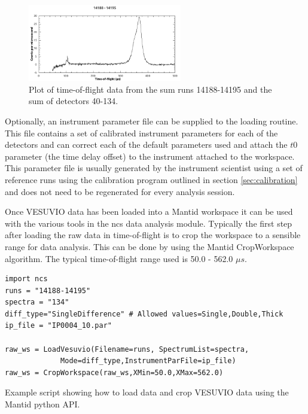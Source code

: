 \documentclass[paper=a4, fontsize=11pt]{scrartcl}	%
\numberwithin{equation}{section}															%
\numberwithin{figure}{section}																%
\numberwithin{table}{section}
\begin{document}
\begin{figure}[H]
\centering
\includegraphics[width=0.6\textwidth]{img/tof-spectrum.png}
\caption{Plot of time-of-flight data from the sum runs 14188-14195 and the sum of detectors 40-134.}
\label{fig:tof-spectrum}
\end{figure}

Optionally, an instrument parameter file can be supplied to the loading routine. This file contains a set of calibrated instrument parameters for each of the detectors and can correct each of the default parameters used and attach the $t0$ parameter (the time delay offset)\cite{mayers2011calibration} to the instrument attached to the workspace. This parameter file is usually generated by the instrument scientist using a set of reference runs using the calibration program outlined in section \ref{sec:calibration} and does not need to be regenerated for every analysis session. 

Once VESUVIO data has been loaded into a Mantid workspace it can be used with the various tools in the ncs data analysis module. Typically the first step after loading the raw data in time-of-flight is to crop the workspace to a sensible range for data analysis. This can be done by using the Mantid CropWorkspace algorithm. The typical time-of-flight range used is 50.0 - 562.0 $\mu s$.

\begin{listing}[H]
\begin{verbatim}
import ncs
runs = "14188-14195"
spectra = "134"
diff_type="SingleDifference" # Allowed values=Single,Double,Thick
ip_file = "IP0004_10.par"

raw_ws = LoadVesuvio(Filename=runs, SpectrumList=spectra,
		     Mode=diff_type,InstrumentParFile=ip_file)
raw_ws = CropWorkspace(raw_ws,XMin=50.0,XMax=562.0)
\end{verbatim}
\caption{Example script showing how to load data and crop VESUVIO data using the Mantid python API.}
\label{lst:loading-data}
\end{listing}
\end{document}
